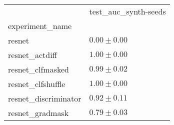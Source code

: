 \begin{tabular}{ll}
\toprule
{} & test_auc_synth-seeds \\
experiment_name      &                      \\
\midrule
resnet               &        $0.00\pm0.00$ \\
resnet_actdiff       &        $1.00\pm0.00$ \\
resnet_clfmasked     &        $0.99\pm0.02$ \\
resnet_clfshuffle    &        $1.00\pm0.00$ \\
resnet_discriminator &        $0.92\pm0.11$ \\
resnet_gradmask      &        $0.79\pm0.03$ \\
\bottomrule
\end{tabular}
